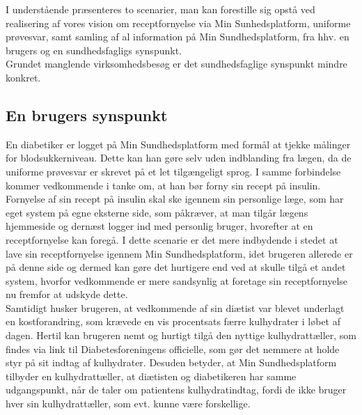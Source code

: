 I understående præsenteres to scenarier, man kan forestille sig opstå ved realisering af vores vision om receptfornyelse via Min Sunhedsplatform, uniforme prøvesvar, samt samling af al information 
 på Min Sundhedsplatform, fra hhv. en brugers og en sundhedsfagligs synspunkt. \\
 Grundet manglende virksomhedsbesøg er det sundhedsfaglige synspunkt mindre konkret. 

\subsection{En brugers synspunkt}
En diabetiker er logget på Min Sundhedsplatform med formål at tjekke målinger for blodsukkerniveau. Dette kan han gøre selv uden indblanding fra lægen, da de uniforme prøvesvar er skrevet på et let tilgængeligt sprog. I samme forbindelse kommer vedkommende i tanke om, at han bør forny sin recept på insulin. Fornyelse af sin recept på insulin skal ske igennem sin personlige læge, som har eget system på egne eksterne side, som påkræver, at man tilgår lægens hjemmeside og dernæst logger ind med personlig bruger, hvorefter at en receptfornyelse kan foregå. I dette scenarie er det mere indbydende i stedet at lave sin receptfornyelse igennem Min Sundhedsplatform, idet brugeren allerede er på denne side og dermed kan gøre det hurtigere end ved at skulle tilgå et andet system, hvorfor vedkommende er mere sandsynlig at foretage sin receptfornyelse nu fremfor at udskyde dette.\\
Samtidigt husker brugeren, at vedkommende af sin diætist var blevet underlagt en kostforandring, som krævede en vis procentsats færre kulhydrater i løbet af dagen. Hertil kan brugeren nemt og hurtigt tilgå den nyttige kulhydrattæller, som findes via link til Diabetesforeningens officielle, som gør det nemmere at holde styr på sit indtag af kulhydrater. Desuden betyder, at Min Sundhedsplatform tilbyder en kulhydrattæller, at diætisten og diabetikeren har samme udgangspunkt, når de taler om patientens kulhydratindtag, fordi de ikke bruger hver sin kulhydrattæller, som evt. kunne være forskellige. 


